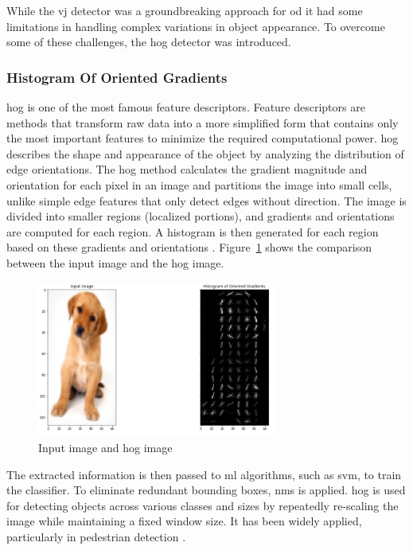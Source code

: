 While the \gls{vj} detector was a groundbreaking approach for \gls{od} it had some limitations in handling complex variations in object appearance. To overcome some of these challenges, the \gls{hog} detector was introduced.

\subsubsection{Histogram Of Oriented Gradients}
 \gls{hog} is one of the most famous feature descriptors. Feature descriptors are methods that transform raw data into a more simplified form that contains only the most important features to minimize the required computational power. \gls{hog} describes the shape and appearance of the object by analyzing the distribution of edge orientations. The \gls{hog} method calculates the gradient magnitude and orientation for each pixel in an image and partitions the image into small cells, unlike simple edge features that only detect edges without direction. The image is divided into smaller regions (localized portions), and gradients and orientations are computed for each region. A histogram is then generated for each region based on these gradients and orientations \cite{HOG}. Figure~\ref{HOG_image} shows the comparison between the input image and the \gls{hog} image.
 
\begin{figure}[!ht]
    \centering
    \includegraphics[width=0.7\textwidth]{Figures/HOG_Histogram_image.PNG} 
    \caption{Input image and \gls{hog} image \cite{HOG}}
    \label{HOG_image}
\end{figure}

The extracted information is then passed to \gls{ml} algorithms, such as \gls{svm}, to train the classifier. To eliminate redundant bounding boxes, \gls{nms} is applied. \gls{hog} is used for detecting objects across various classes and sizes by repeatedly re-scaling the image while maintaining a fixed window size. It has been widely applied, particularly in pedestrian detection \cite{oD_Review}.


